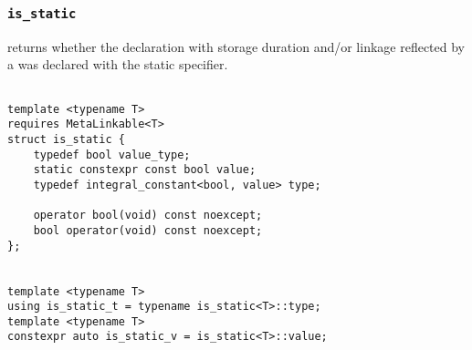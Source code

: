 
\subsubsection{\texttt{is\_static}}

returns whether the declaration with storage duration and/or linkage reflected by a  was declared with the static specifier.

\begin{verbatim}

template <typename T>
requires MetaLinkable<T>
struct is_static {
	typedef bool value_type;
	static constexpr const bool value;
	typedef integral_constant<bool, value> type;

	operator bool(void) const noexcept;
	bool operator(void) const noexcept;
};


template <typename T>
using is_static_t = typename is_static<T>::type;
template <typename T>
constexpr auto is_static_v = is_static<T>::value;

\end{verbatim}
